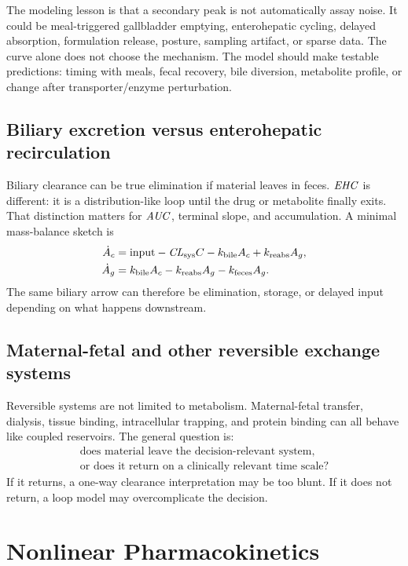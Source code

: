 \documentclass[a4paper]{article}
\newcommand{\pkCL}{\pksym{CL}}
\newcommand{\pkAUC}{\pksym{AUC}}
\newcommand{\pkEHC}{\pksym{EHC}}
\begin{document}
\figureReversibleEhc

The modeling lesson is that a secondary peak is not automatically assay noise. It could be meal-triggered gallbladder emptying, enterohepatic cycling, delayed absorption, formulation release, posture, sampling artifact, or sparse data. The curve alone does not choose the mechanism. The model should make testable predictions: timing with meals, fecal recovery, bile diversion, metabolite profile, or change after transporter/enzyme perturbation.

\subsection{Biliary excretion versus enterohepatic recirculation}

Biliary clearance can be true elimination if material leaves in feces. \(\pkEHC\) is different: it is a distribution-like loop until the drug or metabolite finally exits. That distinction matters for \(\pkAUC\), terminal slope, and accumulation. A minimal mass-balance sketch is
\[
  \begin{aligned}
  \dot A_c &= \text{input}-\pkCL_{\pklab{sys}}C-k_{\pklab{bile}}A_c+k_{\pklab{reabs}}A_g,\\
  \dot A_g &= k_{\pklab{bile}}A_c-k_{\pklab{reabs}}A_g-k_{\pklab{feces}}A_g.
  \end{aligned}
\]
The same biliary arrow can therefore be elimination, storage, or delayed input depending on what happens downstream.

\subsection{Maternal-fetal and other reversible exchange systems}

Reversible systems are not limited to metabolism. Maternal-fetal transfer, dialysis, tissue binding, intracellular trapping, and protein binding can all behave like coupled reservoirs. The general question is:
\[
  \begin{gathered}
  \text{does material leave the decision-relevant system,}\\
  \text{or does it return on a clinically relevant time scale?}
  \end{gathered}
\]
If it returns, a one-way clearance interpretation may be too blunt. If it does not return, a loop model may overcomplicate the decision.

\section{Nonlinear Pharmacokinetics}
\end{document}
